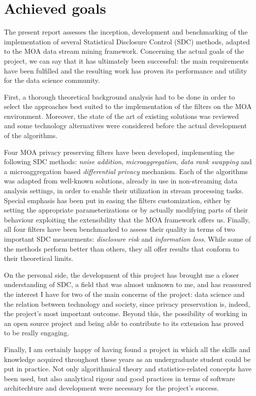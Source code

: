 \section{Achieved goals}
\label{Conclusions:Achieved}

The present report assesses the inception, development and benchmarking of the implementation of several Statistical Disclosure Control (SDC) methods, adapted to the MOA data stream mining framework. Concerning the actual goals of the project, we can say that it has ultimately been successful: the main requirements have been fulfilled and the resulting work has proven its performance and utility for the data science community.

First, a thorough theoretical background analysis had to be done in order to select the approaches best suited to the implementation of the filters on the MOA environment. Moreover, the state of the art of existing solutions was reviewed and some technology alternatives were considered before the actual development of the algorithms.

Four MOA privacy preserving filters have been developed, implementing the following SDC methods: \textit{noise addition}, \textit{microaggregation}, \textit{data rank swapping} and a microaggregation based \textit{differential privacy} mechanism. Each of the algorithms was adapted from well-known solutions, already in use in non-streaming data analysis settings, in order to enable their utilization in stream processing tasks. Special emphasis has been put in easing the filters customization, either by setting the appropriate parameterizations or by actually modifying parts of their behaviour exploiting the extensibility that the MOA framework offers us. Finally, all four filters have been benchmarked to assess their quality in terms of two important SDC measurments: \textit{disclosure risk} and \textit{information loss}. While some of the methods perform better than others, they all offer results that conform to their theoretical limits.

On the personal side, the development of this project has brought me a closer understanding of SDC, a field that was almost unknown to me, and has reassured the interest I have for two of the main concerns of the project: data science and the relation between technology and society, since privacy preservation is, indeed, the project's most important outcome. Beyond this, the possibility of working in an open source project and being able to contribute to its extension has proved to be really engaging.

Finally, I am certainly happy of having found a project in which all the skills and knowledge acquired throughout these years as an undergraduate student could be put in practice. Not only algorithmical theory and statistics-related concepts have been used, but also analytical rigour and good practices in terms of software architechture and development were necessary for the project's success.